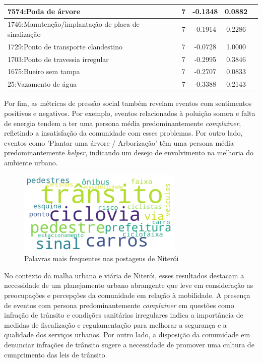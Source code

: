 \begin{table}[htbp]
\begin{tabular}{|l|c|c|c|c|}
		\hline
		7574:Poda de árvore                                 & 7                & -0.1348        & 0.0882           \\
		\hline
		1746:Manutenção/implantação de placa de sinalização & 7                & -0.1914        & 0.2286           \\
		\hline
		1729:Ponto de transporte clandestino                & 7                & -0.0728        & 1.0000           \\
		\hline
		1703:Ponto de travessia irregular                   & 7                & -0.2995        & 0.3846           \\
		\hline
		1675:Bueiro sem tampa                               & 7                & -0.2707        & 0.0833           \\
		\hline
		25:Vazamento de água                                & 7                & -0.3388        & 0.2143           \\
		\hline
	\end{tabular}
\end{table}

Por fim, as métricas de pressão social também revelam eventos com sentimentos positivos e negativos. Por exemplo, eventos relacionados à poluição sonora e falta de energia tendem a ter uma persona média predominantemente \textit{complainer}, refletindo a insatisfação da comunidade com esses problemas. Por outro lado, eventos como 'Plantar uma árvore / Arborização' têm uma persona média predominantemente \textit{helper}, indicando um desejo de envolvimento na melhoria do ambiente urbano.

\begin{figure}[htb]
	\centering
	\includegraphics[width=0.7\textwidth]{images/wordcloud_niteroi.png}
	\caption{Palavras mais frequentes nas postagens de Niterói}
	\label{fig:wordcloud_niteroi}
\end{figure}

No contexto da malha urbana e viária de Niterói, esses resultados destacam a necessidade de um planejamento urbano abrangente que leve em consideração as preocupações e percepções da comunidade em relação à mobilidade. A presença de eventos com persona predominantemente \textit{complainer} em questões como infração de trânsito e condições sanitárias irregulares indica a importância de medidas de fiscalização e regulamentação para melhorar a segurança e a qualidade dos serviços urbanos. Por outro lado, a disposição da comunidade em denunciar infrações de trânsito sugere a necessidade de promover uma cultura de cumprimento das leis de trânsito.

